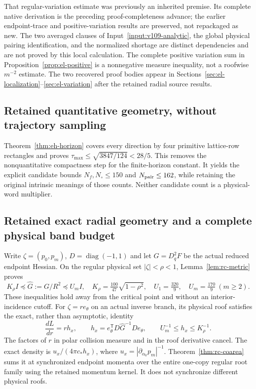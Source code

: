 \documentclass[11pt,reqno]{amsart}
\numberwithin{equation}{section}
\theoremstyle{definition}\newtheorem{definition}[theorem]{Definition}
\theoremstyle{remark}\newtheorem{remark}[theorem]{Remark}
\begin{document}
That regular-variation estimate was previously an inherited premise.
Its complete native derivation is the preceding proof-completeness advance;
the earlier endpoint-trace and positive-variation results are preserved,
not repackaged as new. The two averaged clauses of
Input~\ref{input:v109-analytic}, the global physical pairing identification,
and the normalized shortage are distinct dependencies and are not
proved by this local calculation. The complete positive variation sum
in Proposition~\ref{prop:el-positive} is a nonnegative measure inequality,
not a roofwise $m^{-2}$ estimate. The two recovered proof bodies appear in
Sections~\ref{sec:el-localization}--\ref{sec:el-variation} after the retained
radial source results.

\subsection*{Retained quantitative geometry, without trajectory sampling}
Theorem~\ref{thm:eh-horizon} covers every direction by four primitive
lattice-row rectangles and proves
$\tau_{\max}\le\sqrt{3847/124}<28/5$. This removes the nonquantitative
compactness step for the finite-horizon constant. It yields the explicit
candidate bounds $N_f,N_\circ\le150$ and $N_{\rm pair}\le162$,
while retaining the original intrinsic meanings of those counts.
Neither candidate count is a physical-word multiplier.

\subsection*{Retained exact radial geometry and a complete physical band budget}
Write $\zeta=(p_0,p_m)$, $D=\operatorname{diag}(-1,1)$ and let
$G=D_q^2F$ be the actual reduced endpoint Hessian. On the regular
physical set $|\zeta|<\rho<1$, Lemma~\ref{lem:rc-metric} proves
\[
 K_\rho I\preceq\widehat G:=G/R^2\preceq U_m I,
 \quad K_\rho=\tfrac{100}{47}\sqrt{1-\rho^2},\quad
 U_1=\tfrac{320}{9},\quad U_m=\tfrac{170}{9}\ (m\ge2).
\]
These inequalities hold away from the critical point and without an
interior-incidence cutoff. For $\zeta=re_\theta$ on an actual inverse
branch, its physical roof satisfies the exact, rather than asymptotic,
identity
\[
 \frac{dL}{dr}=r h_x,\qquad
 h_x=e_\theta^{\mathsf T}D\widehat G^{-1}De_\theta,
 \qquad U_m^{-1}\le h_x\le K_\rho^{-1}.
\]
The factors of $r$ in polar collision measure and in the roof derivative
cancel. The exact density is
$u_x/(4\pi c_*h_x)$, where
$u_x=|\partial_{\alpha_0}p_m|^{-1}$.
Theorem~\ref{thm:rc-coarea} sums it at synchronized endpoint momenta
over the entire one-copy regular root family using the retained momentum
kernel. It does not synchronize different physical roofs.
\end{document}
